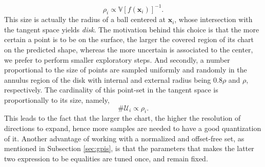 \begin{equation}
\rho_i \propto \mathbb{V}[f(\mathbf{x}_i)]^{-1}.
\end{equation}
This size is actually the radius of a ball centered at $\mathbf{x}_i$, whose intersection with the tangent space yields \emph{disk}. The motivation behind this choice is that the more certain a point is to be on the surface, the larger the covered region of its chart on the predicted shape, whereas the more uncertain is associated to the center, we prefer to perform smaller exploratory steps.
And secondly, a number proportional to the size of points are sampled uniformly and randomly in the annulus region of the disk with internal and external radius being $0.8\rho$ and $\rho$, respectively. The cardinality of this point-set in the tangent space is proportionally to its size, namely,
\begin{equation}
\#\mathcal{U}_i \propto \rho_i.
\end{equation}
This leads to the fact that the larger the chart, the higher the resolution of directions to expand, hence more samples are needed to have a good quantization of it.
Another advantage of working with a normalized and offset-free set, as mentioned in Subsection \ref{sec:gpis}, is that the parameters that makes the latter two expression to be equalities are tuned once, and remain fixed.

